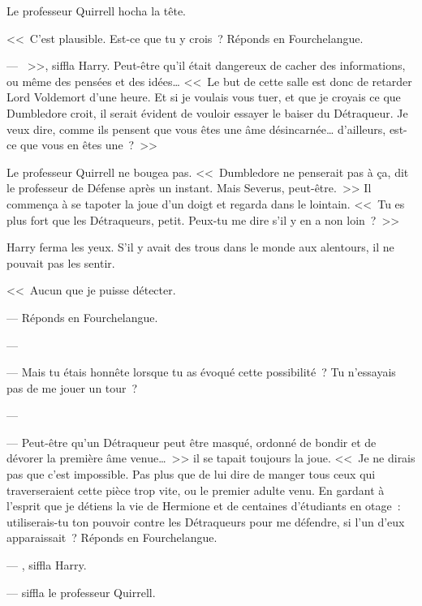 Le professeur Quirrell hocha la tête.

<<~C'est plausible. Est-ce que tu y crois~? Réponds en Fourchelangue.

--- ~>>, siffla Harry. Peut-être qu'il était dangereux de cacher des informations, ou même des pensées et des idées… <<~Le but de cette salle est donc de retarder Lord Voldemort d'une heure. Et si je voulais vous tuer, et que je croyais ce que Dumbledore croit, il serait évident de vouloir essayer le baiser du Détraqueur. Je veux dire, comme ils pensent que vous êtes une âme désincarnée… d'ailleurs, est-ce que vous en êtes une~?~>>

Le professeur Quirrell ne bougea pas. <<~Dumbledore ne penserait pas à ça, dit le professeur de Défense après un instant. Mais Severus, peut-être.~>> Il commença à se tapoter la joue d'un doigt et regarda dans le lointain. <<~Tu es plus fort que les Détraqueurs, petit. Peux-tu me dire s'il y en a non loin~?~>>

Harry ferma les yeux. S'il y avait des trous dans le monde aux alentours, il ne pouvait pas les sentir.

<<~Aucun que je puisse détecter.

--- Réponds en Fourchelangue.

--- 

--- Mais tu étais honnête lorsque tu as évoqué cette possibilité~? Tu n'essayais pas de me jouer un tour~?

--- 

--- Peut-être qu'un Détraqueur peut être masqué, ordonné de bondir et de dévorer la première âme venue…~>> il se tapait toujours la joue. <<~Je ne dirais pas que c'est impossible. Pas plus que de lui dire de manger tous ceux qui traverseraient cette pièce trop vite, ou le premier adulte venu. En gardant à l'esprit que je détiens la vie de Hermione et de centaines d'étudiants en otage~: utiliserais-tu ton pouvoir contre les Détraqueurs pour me défendre, si l'un d'eux apparaissait~? Réponds en Fourchelangue.

--- , siffla Harry.

---  siffla le professeur Quirrell. 

